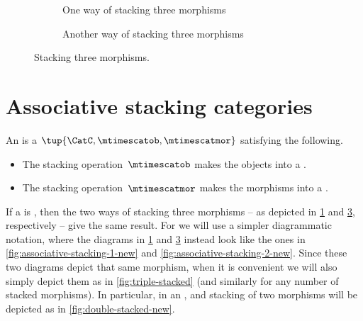 \begin{figure}[tbh]
    \centering
    \begin{subfigure}{0.49\linewidth}
        \caption{One way of stacking three morphisms}
        \label{fig:associative-stacking-1}
    \end{subfigure}
    \begin{subfigure}{0.49\linewidth}
        \caption{Another way of stacking three morphisms}
        \label{fig:associative-stacking-2}
    \end{subfigure}
    \caption{Stacking three morphisms.}
\end{figure}



\section{Associative stacking categories}


\begin{ctdefinition}
    \label{def:assoc-stacking-cat}
    An  is a  $\tup{\CatC, \mtimescatob, \mtimescatmor}$ satisfying the following.

    \condit
    \begin{itemize}
        \item The stacking operation~$\mtimescatob$ makes the objects into a .
        \item The stacking operation~$\mtimescatmor$ makes the morphisms into a .
    \end{itemize}
\end{ctdefinition}


If a  is , then the two ways of stacking three morphisms -- as depicted in \cref{fig:associative-stacking-1} and \cref{fig:associative-stacking-2}, respectively -- give the same result.
For   we will use a simpler diagrammatic notation, where the diagrams in \cref{fig:associative-stacking-1} and \cref{fig:associative-stacking-2} instead look like the ones in \cref{fig:associative-stacking-1-new} and \cref{fig:associative-stacking-2-new}.
Since these two diagrams depict that same morphism, when it is convenient we will also simply depict them as in \cref{fig:triple-stacked} (and similarly for any number of stacked morphisms).
In particular, in an  , and stacking of two morphisms will be depicted as in \cref{fig:double-stacked-new}.

